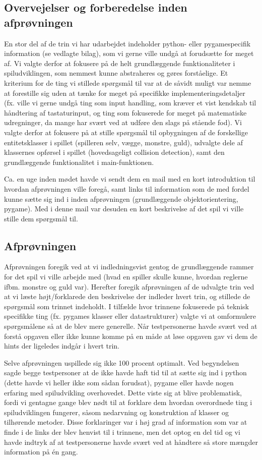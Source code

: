 \documentclass[10pt,a4paper,danish]{article}
\begin{document}
\subsection{Overvejelser og forberedelse inden afprøvningen}
En stor del af de trin vi har udarbejdet indeholder python- eller pygamespecifik information (se vedlagte bilag), som 
vi gerne ville undgå at forudsætte for meget af. Vi valgte derfor at fokusere på de helt 
grundlæggende funktionaliteter i spiludviklingen, som nemmest kunne abstraheres og gøres forståelige.
Et kriterium for de ting vi stillede spørgsmål til var at de såvidt muligt var nemme at
forestille sig uden at tænke for meget på specifikke implementeringsdetaljer (fx. ville vi gerne undgå
ting som input handling, som kræver et vist kendskab til håndtering af tastaturinput, og ting som 
fokuserede for meget på matematiske udregninger, da mange har svært ved at udføre den slags på stående fod). 
Vi valgte derfor at fokusere på at stille spørgsmål til opbygningen af de forskellige entitetsklasser i spillet
(spilleren selv, vægge, monstre, guld), udvalgte dele af klassernes opførsel i spillet (hovedsageligt collision
detection), samt den grundlæggende funktionalitet i main-funktionen. 

Ca. en uge inden mødet havde vi sendt dem en mail med en kort introduktion til hvordan afprøvningen 
ville foregå, samt links til information som de med fordel kunne sætte sig ind i inden afprøvningen 
(grundlæggende objektorientering, pygame). Med i denne mail var desuden en kort beskrivelse af det spil
vi ville stille dem spørgsmål til. 

\subsection{Afprøvningen}
Afprøvningen foregik ved at vi indledningsvist gentog de grundlæggende rammer for det
spil vi ville arbejde med (hvad en spiller skulle kunne, 
hvordan reglerne ifbm. monstre og guld var). Herefter foregik afprøvningen af de
udvalgte trin ved at vi læste højt/forklarede den beskrivelse der indleder hvert 
trin, og stillede de spørgsmål som trinnet indeholdt. I tilfælde hvor trinnene
fokuserede på teknisk specifikke ting (fx. pygames klasser eller datastrukturer) 
valgte vi at omformulere spørgsmålene så at de blev mere generelle. Når testpersonerne havde
svært ved at forstå opgaven eller ikke kunne komme på en måde at løse opgaven
gav vi dem de hints der ligeledes indgår i hvert trin. 

Selve afprøvningen uspillede sig ikke 100 procent optimalt. Ved begyndelsen sagde
begge testpersoner at de ikke havde haft tid til at sætte sig 
ind i python (dette havde vi heller ikke som sådan forudsat), pygame eller havde nogen 
erfaring med spiludvikling overhovedet. Dette viste sig at blive problematisk, fordi 
vi gentagne gange blev nødt til at forklare dem hvordan overordnede ting i spiludviklingen
fungerer, såsom nedarvning og konstruktion af klasser og tilhørende metoder. Disse forklaringer
var i høj grad af information som var at finde i de links der blev henvist til i trinnene, 
men det optog en del tid og vi havde indtryk af at testpersonerne havde svært ved at 
håndtere så store mængder information på én gang. 
\end{document}
